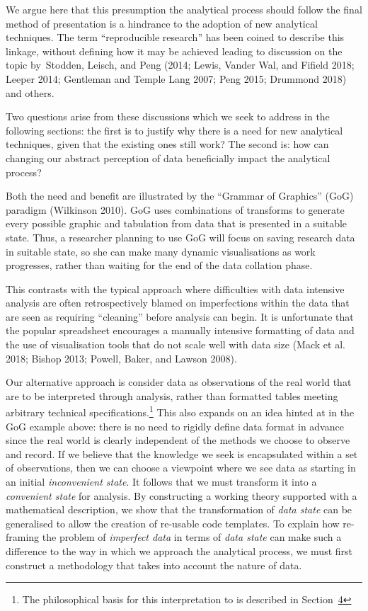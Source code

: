 \documentclass[
]{article}
\begin{document}
We argue here that this presumption the analytical process should follow
the final method of presentation is a hindrance to the adoption of new
analytical techniques. The term ``reproducible research'' has been
coined to describe this linkage, without defining how it may be achieved
leading to discussion on the topic by~Stodden, Leisch, and Peng (2014;
Lewis, Vander Wal, and Fifield 2018; Leeper 2014; Gentleman and Temple
Lang 2007; Peng 2015; Drummond 2018) and others.

Two questions arise from these discussions which we seek to address in
the following sections: the first is to justify why there is a need for
new analytical techniques, given that the existing ones still work? The
second is: how can changing our abstract perception of data beneficially
impact the analytical process?

Both the need and benefit are illustrated by the ``Grammar of Graphics''
(GoG) paradigm (Wilkinson 2010). GoG uses combinations of transforms to
generate every possible graphic and tabulation from data that is
presented in a suitable state. Thus, a researcher planning to use GoG
will focus on saving research data in suitable state, so she can make
many dynamic visualisations as work progresses, rather than waiting for
the end of the data collation phase.

This contrasts with the typical approach where difficulties with data
intensive analysis are often retrospectively blamed on imperfections
within the data that are seen as requiring ``cleaning'' before analysis
can begin. It is unfortunate that the popular spreadsheet encourages a
manually intensive formatting of data and the use of visualisation tools
that do not scale well with data size (Mack et al. 2018; Bishop 2013;
Powell, Baker, and Lawson 2008).

Our alternative approach is consider data as observations of the real
world that are to be interpreted through analysis, rather than formatted
tables meeting arbitrary technical specifications.\footnote{The
  philosophical basis for this interpretation to is described in
  Section~\protect\hyperlink{sec:the-definition-of-data-}{4}} This also
expands on an idea hinted at in the GoG example above: there is no need
to rigidly define data format in advance since the real world is clearly
independent of the methods we choose to observe and record. If we
believe that the knowledge we seek is encapsulated within a set of
observations, then we can choose a viewpoint where we see data as
starting in an initial \emph{inconvenient state}. It follows that we
must transform it into a \emph{convenient state} for analysis. By
constructing a working theory supported with a mathematical description,
we show that the transformation of \emph{data state} can be generalised
to allow the creation of re-usable code templates. To explain how
re-framing the problem of \emph{imperfect data} in terms of \emph{data
state} can make such a difference to the way in which we approach the
analytical process, we must first construct a methodology that takes
into account the nature of data.
\end{document}
